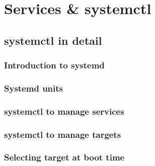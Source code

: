 \documentclass[14pt,fleqn]{extbook} %
\begin{document}
\tableofcontents


\cleardoublepage %

\pagestyle{fancy} %




\chapter{Services \& systemctl}
\section{systemctl in detail}

\subsection{Introduction to systemd}

\subsection{Systemd units}

\subsection{systemctl to manage services}

\subsection{systemctl to manage targets}

\subsection{Selecting target at boot time}

\end{document}
